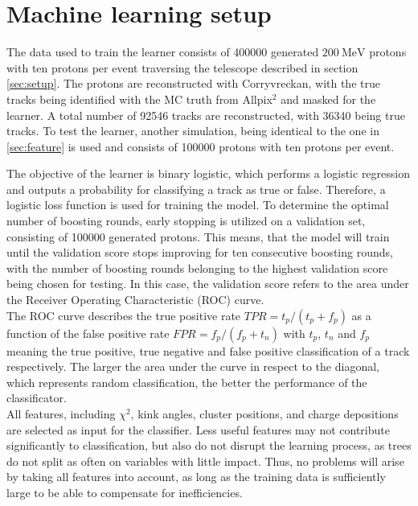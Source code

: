 \section{Machine learning setup}
The data used to train the learner %
consists of 400000 generated $\SI{200}{\mega\eV}$ protons with ten protons per event
traversing the telescope described in section \ref{sec:setup}. The protons
are reconstructed with Corryvreckan, with the true tracks being identified with the MC truth from Allpix$^2$ and masked for the learner. A total number of 92546 tracks
are reconstructed, with 36340 being true tracks.
To test the learner, another simulation, being identical to the one in \ref{sec:feature} is used and consists of 100000 protons with ten protons per event.

The objective of the learner is binary logistic, which performs a logistic regression and outputs a probability for classifying a track as true or false.
Therefore, a logistic loss function is used for training the model.
To determine the optimal number of boosting rounds, early stopping is utilized on a validation set, consisting of 100000 generated protons. This means, that
the model will train until the validation score stops improving for ten consecutive boosting rounds, with the number
of boosting rounds belonging to the highest validation score being chosen for testing. In this case, the validation score refers to the area under the
Receiver Operating Characteristic (ROC) curve. \\
The ROC curve describes the true positive rate $TPR = t_p/(t_p + f_p)$ as a function of the false positive rate $FPR = f_p/(f_p + t_n)$ with
$t_p$, $t_n$ and $f_p$ meaning the true positive, true negative and false positive classification of a track respectively. The larger the area under the curve in respect
to the diagonal, which represents random classification, the better the performance of the classificator. \\
All features, including $\chi^2$, kink angles, cluster positions, and charge depositions are selected as input for the classifier. Less useful features
may not contribute significantly to classification, but also do not disrupt the learning process, as trees do not split as often on variables with little impact.
Thus, no problems will arise by taking all features into account, as long as the training data is sufficiently large to be able to compensate for inefficiencies.

